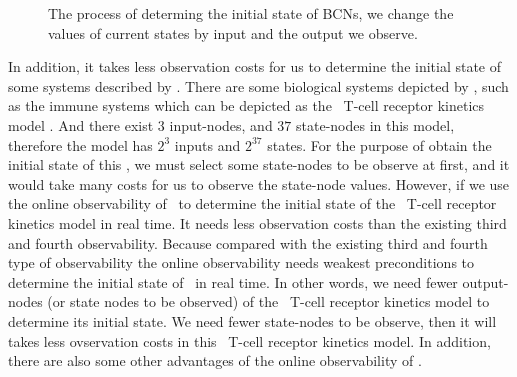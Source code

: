 \begin{figure}[thpb]
      \centering
      
      \caption{The process of determing the initial state of BCNs, we change the values of current states by input and the output we observe. }
      \label{fig:5}
   \end{figure}
In addition, it takes less observation costs for us to determine the initial state of some systems described by \BCNs. There are some biological systems depicted by \BCNs, such as the immune systems which can be depicted as the \BCN\ T-cell receptor kinetics model \cite{Klamt2006A}. And there exist $3$ input-nodes, and $37$ state-nodes in this model, therefore the model has $2^3$ inputs and $2^{37}$ states. For the purpose of obtain the initial state of this \BCN, we must select some state-nodes to be observe at first, and it would take many costs for us to observe the state-node values. However, if we use the online observability of \BCNs\ to determine the initial state of the \BCN\ T-cell receptor kinetics model in real time. It needs less observation costs than the existing third and fourth observability. Because compared with the existing third and fourth type of observability the online observability needs weakest preconditions to determine the initial state of \BCNs\ in real time. In other words, we need fewer output-nodes (or state nodes to be observed) of the \BCN\ T-cell receptor kinetics model to determine its initial state. We need fewer state-nodes to be observe, then it will takes less ovservation costs in this \BCN\ T-cell receptor kinetics model. In addition, there are also some other advantages of the online observability of \BCNs.

